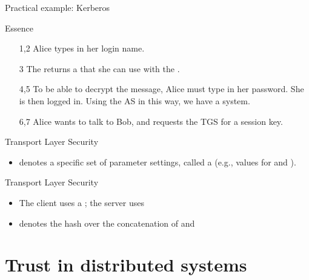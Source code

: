 \begin{slide}{Practical example: Kerberos}
  \begin{centerfig}
  \end{centerfig}
  \begin{block}{Essence}
    \begin{enumerate}
    \item[1,2] Alice types in her login name.
    \item[3] The  returns a   that she can
      use with the . 
    \item[4,5] To be able to decrypt the message, Alice must type in her password. She is then logged
      in. Using the AS in this way, we have a  system.
    \item[6,7] Alice wants to talk to Bob, and requests the TGS for a session key.
    \end{enumerate}
  \end{block}
  
\end{slide}
\begin{slide}{Transport Layer Security}
  \begin{centerfig}
  \end{centerfig}
  \begin{itemize}
  \item {} denotes a specific set of parameter settings, called a  (e.g., values for 
    and ).
  \end{itemize}
\end{slide}
\begin{slide}{Transport Layer Security}
  \begin{centerfig}
  \end{centerfig}
  \begin{itemize}
  \item The client uses a  ; the server uses 
  \item {} denotes the hash over the concatenation of  and 
  \end{itemize}
\end{slide}
\section{Trust in distributed systems}
